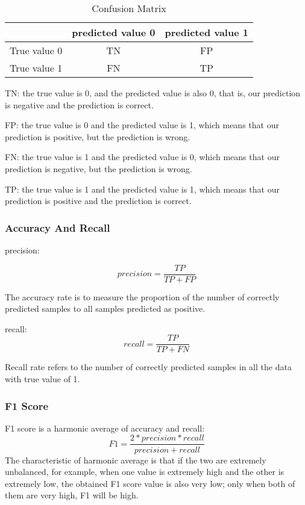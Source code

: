 \begin{table}  \centering
  \caption{Confusion Matrix}
  \label{tbl:overall-experiments}
  \begin{tabular}{ccc}
  \toprule
    & predicted value 0 & predicted value 1  \\
  \midrule
    True value 0 & TN & FP  \\
    True value 1 & FN & TP  \\
  \bottomrule
  \end{tabular}
\end{table}


TN:
the true value is 0,
and the predicted value is also 0,
that is,
our prediction is negative and the prediction is correct.

FP:
the true value is 0 and the predicted value is 1,
which means that our prediction is positive,
but the prediction is wrong.

FN:
the true value is 1 and the predicted value is 0,
 which means that our prediction is negative,
  but the prediction is wrong.

TP:
the true value is 1 and the predicted value is 1,
which means that our prediction is positive and the
prediction is correct.

\subsubsection{Accuracy  And Recall}

precision:

\begin{equation}
  precision=\frac{TP}{TP+FP}
\end{equation}

The accuracy rate is to measure the proportion of
the number of correctly predicted samples to all
 samples predicted as positive.

recall:
\begin{equation}
  recall=\frac{TP}{TP+FN}
\end{equation}

Recall rate refers to the number of correctly
predicted samples in all the data with true
value of 1.
\subsubsection{F1 Score}
F1 score is a harmonic average of accuracy and recall:
\begin{equation}
  F1=\frac{2*precision*recall}{precision+recall}
\end{equation}
The characteristic of harmonic average is that if
the two are extremely unbalanced,
for example, when one value is extremely
high and the other is extremely low,
the obtained F1 score value is also very low;
only when both of them are very high,
F1 will be high.
